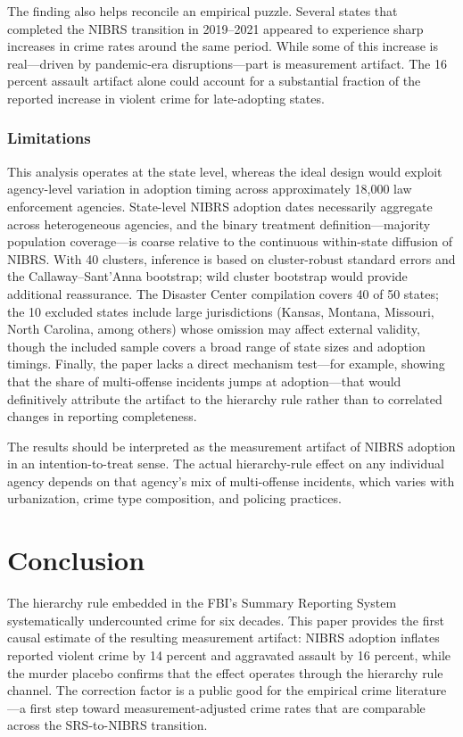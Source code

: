 \documentclass[12pt]{article}
\begin{document}
The finding also helps reconcile an empirical puzzle. Several states that completed the NIBRS transition in 2019--2021 appeared to experience sharp increases in crime rates around the same period. While some of this increase is real---driven by pandemic-era disruptions---part is measurement artifact. The 16 percent assault artifact alone could account for a substantial fraction of the reported increase in violent crime for late-adopting states.

\subsubsection*{Limitations} This analysis operates at the state level, whereas the ideal design would exploit agency-level variation in adoption timing across approximately 18,000 law enforcement agencies. State-level NIBRS adoption dates necessarily aggregate across heterogeneous agencies, and the binary treatment definition---majority population coverage---is coarse relative to the continuous within-state diffusion of NIBRS. With 40 clusters, inference is based on cluster-robust standard errors and the Callaway--Sant'Anna bootstrap; wild cluster bootstrap would provide additional reassurance. The Disaster Center compilation covers 40 of 50 states; the 10 excluded states include large jurisdictions (Kansas, Montana, Missouri, North Carolina, among others) whose omission may affect external validity, though the included sample covers a broad range of state sizes and adoption timings. Finally, the paper lacks a direct mechanism test---for example, showing that the share of multi-offense incidents jumps at adoption---that would definitively attribute the artifact to the hierarchy rule rather than to correlated changes in reporting completeness.

The results should be interpreted as the measurement artifact of NIBRS adoption in an intention-to-treat sense. The actual hierarchy-rule effect on any individual agency depends on that agency's mix of multi-offense incidents, which varies with urbanization, crime type composition, and policing practices.

\section{Conclusion}

The hierarchy rule embedded in the FBI's Summary Reporting System systematically undercounted crime for six decades. This paper provides the first causal estimate of the resulting measurement artifact: NIBRS adoption inflates reported violent crime by 14 percent and aggravated assault by 16 percent, while the murder placebo confirms that the effect operates through the hierarchy rule channel. The correction factor is a public good for the empirical crime literature---a first step toward measurement-adjusted crime rates that are comparable across the SRS-to-NIBRS transition.
\end{document}
